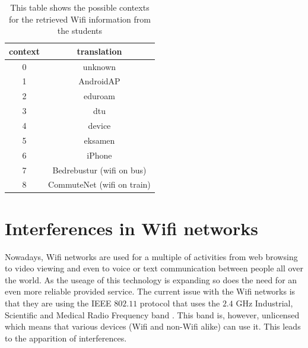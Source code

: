 \begin{table}[h]
\centering
\begin{tabular}{cc}
\hline
\textbf{context} & \textbf{translation}       \\ \hline
0                & unknown                    \\
1                & AndroidAP                  \\
2                & eduroam                    \\
3                & dtu                        \\
4                & device                     \\
5                & eksamen                    \\
6                & iPhone                     \\
7                & Bedrebustur (wifi on bus)  \\
8                & CommuteNet (wifi on train) \\ \hline
\end{tabular}
\caption{This table shows the possible contexts for the retrieved Wifi
information from the students}
\label{tab:context_translation}
\end{table}


\section{Interferences in Wifi networks}

Nowadays, Wifi networks are used for a multiple of activities from web browsing
to video viewing and even to voice or text communication between people all over
the world. As the useage of this technology is expanding so does the need for an
even more reliable provided service. The current issue with the Wifi networks is
that they are using the IEEE $802.11$ protocol \cite{WLP} that uses the $2.4$
GHz Industrial, Scientific and Medical Radio Frequency band
\cite{Flickenger:2003:BWC:940809}. This band is, however, unlicensed which means
that various devices (Wifi and non-Wifi alike) can use it. This leads to the
apparition of interferences. 

